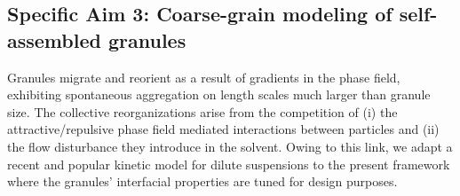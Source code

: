 \subsection{Specific Aim 3: Coarse-grain modeling of self-assembled granules}
\label{sec:specificaim3}

Granules migrate and reorient
as a result of gradients in the phase field,
exhibiting spontaneous aggregation on length
scales much larger than granule size.
The collective reorganizations arise from
the competition of (i) the attractive/repulsive phase field mediated
interactions between particles and (ii) the flow disturbance they
introduce in the solvent. Owing to this link, we adapt a recent
and popular kinetic model for dilute suspensions
to the present framework where the
granules' interfacial properties are tuned for design purposes.

